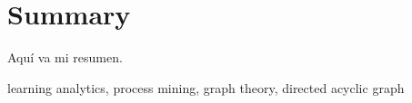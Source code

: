 \chapter*{Summary}

\begin{otherlanguage}{english}

Aquí va mi resumen.

\small{ learning analytics, \; process mining, \; graph theory, \; directed acyclic graph}

\end{otherlanguage}